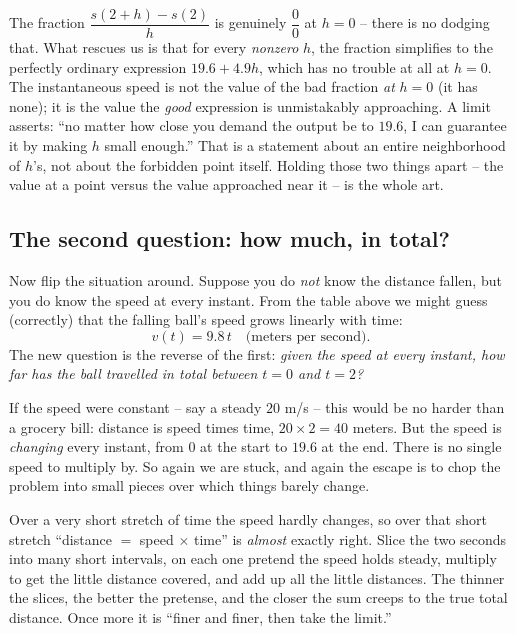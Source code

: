 \begin{happeningbox}
The fraction $\dfrac{s(2+h)-s(2)}{h}$ is genuinely $\dfrac{0}{0}$ at $h = 0$ --
there is no dodging that. What rescues us is that for every \emph{nonzero} $h$,
the fraction simplifies to the perfectly ordinary expression $19.6 + 4.9h$,
which has no trouble at all at $h = 0$. The instantaneous speed is not the value
of the bad fraction \emph{at} $h=0$ (it has none); it is the value the
\emph{good} expression is unmistakably approaching. A limit asserts: ``no matter
how close you demand the output be to $19.6$, I can guarantee it by making $h$
small enough.'' That is a statement about an entire neighborhood of $h$'s, not
about the forbidden point itself. Holding those two things apart -- the value at
a point versus the value approached near it -- is the whole art.
\end{happeningbox}

\subsection{The second question: how much, in total?}

Now flip the situation around. Suppose you do \emph{not} know the distance
fallen, but you do know the speed at every instant. From the table above we
might guess (correctly) that the falling ball's speed grows linearly with time:
\[
  v(t) = 9.8\,t \quad\text{(meters per second).}
\]
The new question is the reverse of the first: \emph{given the speed at every
instant, how far has the ball travelled in total between $t = 0$ and $t = 2$?}

If the speed were constant -- say a steady $20$ m/s -- this would be no harder
than a grocery bill: distance is speed times time, $20 \times 2 = 40$ meters.
But the speed is \emph{changing} every instant, from $0$ at the start to $19.6$
at the end. There is no single speed to multiply by. So again we are stuck, and
again the escape is to chop the problem into small pieces over which things
barely change.

\begin{intuitionbox}
Over a very short stretch of time the speed hardly changes, so over that short
stretch ``distance $=$ speed $\times$ time'' is \emph{almost} exactly right.
Slice the two seconds into many short intervals, on each one pretend the speed
holds steady, multiply to get the little distance covered, and add up all the
little distances. The thinner the slices, the better the pretense, and the
closer the sum creeps to the true total distance. Once more it is ``finer and
finer, then take the limit.''
\end{intuitionbox}

